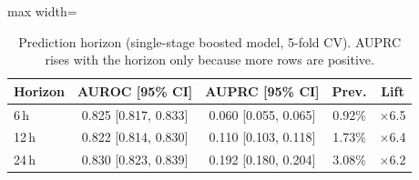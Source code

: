 \begin{table}[!t]
\centering\footnotesize\setlength{\tabcolsep}{3pt}
\caption{Prediction horizon (single-stage boosted model, 5-fold CV). AUPRC rises with the horizon only because more rows are positive.}
\label{tab:horizon}
\begin{adjustbox}{max width=\linewidth}
\begin{tabular}{lcccc}
\toprule
Horizon & AUROC [95\% CI] & AUPRC [95\% CI] & Prev. & Lift \\
\midrule
6\,h & 0.825 [0.817, 0.833] & 0.060 [0.055, 0.065] & 0.92\% & $\times$6.5 \\
12\,h & 0.822 [0.814, 0.830] & 0.110 [0.103, 0.118] & 1.73\% & $\times$6.4 \\
24\,h & 0.830 [0.823, 0.839] & 0.192 [0.180, 0.204] & 3.08\% & $\times$6.2 \\
\bottomrule
\end{tabular}
\end{adjustbox}
\end{table}
